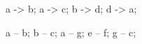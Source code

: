 \documentclass[a4paper]{article}
\begin{document}
\begin{dotpic}[width=.5\textwidth]
	a -> b;
	a -> c;
	b -> d;
	d -> a;
\end{dotpic}

\begin{neatopic}
	a -- b;
	b -- c;
	a -- g;
	e -- f;
	g -- c;
\end{neatopic}
\end{document}
